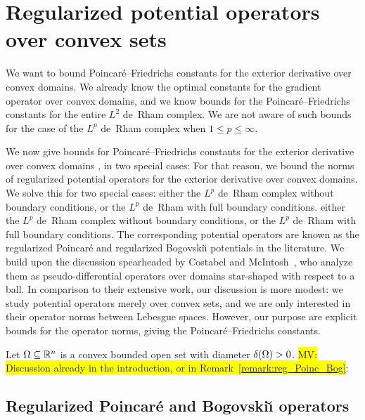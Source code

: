 \documentclass[10pt,a4paper]{article}
\newcommand{\todo}[1]{{\colorbox{yellow}{#1}}}
\newcommand\cye[1]{%
\protect\leavevmode
\begingroup
    \color{blue}%
    #1%
\endgroup
}
\newcommand{\mwl}[1]{{\color{red}#1}}
\begin{document}
\section{Regularized potential operators over convex sets}\label{section:potentialoperator}


We want to bound Poincar\'e--Friedrichs constants for the exterior derivative over convex domains.
We already know the optimal constants for the gradient operator over convex domains,
and we know bounds for the Poincar\'e--Friedrichs constants for the entire $L^{2}$ de~Rham complex. 
We are not aware of such bounds for the case of the $L^{p}$ de~Rham complex when $1 \leq p \leq \infty$. 

\mwl{We \cye{now give} bounds for Poincar\'e--Friedrichs constants for the exterior derivative over convex domains\cye{, in} two special cases:}
For that reason, we bound the norms of regularized potential operators for the exterior derivative over convex domains.
We solve this for two special cases: 
either the $L^{p}$ de~Rham complex without boundary conditions, 
or the $L^{p}$ de~Rham with full boundary conditions. 
either the $L^{p}$ de~Rham complex without boundary conditions, 
or the $L^{p}$ de~Rham with full boundary conditions. 
The corresponding potential operators are known as the regularized Poincar\'e and regularized Bogovski\u{\i} potentials in the literature. 
We build upon the discussion spearheaded by Costabel and McIntosh~\cite{costabel2010bogovskiui},
who analyze them as pseudo-differential operators over domains star-shaped with respect to a ball. 
% 
In comparison to their extensive work, our discussion is more modest:
we study potential operators merely over convex sets, and we are only interested in their operator norms between Lebesgue spaces.
However, our purpose are explicit bounds for the operator norms, giving the Poincar\'e--Friedrichs constants. 

Let $\Omega \subseteq {\mathbb R}^{n}$ is a convex bounded open set with diameter ${\delta}(\Omega) > 0$.
\todo{MV: Discussion already in the introduction, or in Remark~\ref{remark:reg_Poinc_Bog}}: 








\subsection{Regularized Poincar\'e and Bogovski\u{\i} operators}
\end{document}
